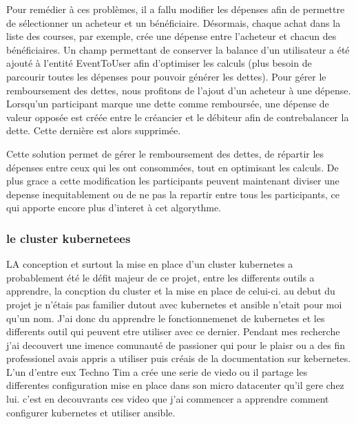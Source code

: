 Pour remédier à ces problèmes, il a fallu modifier les dépenses afin de permettre de sélectionner un acheteur et un bénéficiaire.
Désormais, chaque achat dans la liste des courses, par exemple, crée une dépense entre l'acheteur et chacun des bénéficiaires.
Un champ permettant de conserver la balance d'un utilisateur a été ajouté à l'entité EventToUser afin d'optimiser les calculs (plus besoin de parcourir toutes les dépenses pour pouvoir générer les dettes).
Pour gérer le remboursement des dettes, nous profitons de l'ajout d'un acheteur à une dépense.
Lorsqu'un participant marque une dette comme remboursée, une dépense de valeur opposée est créée entre le créancier et le débiteur afin de contrebalancer la dette.
Cette dernière est alors supprimée.

Cette solution permet de gérer le remboursement des dettes, de répartir les dépenses entre ceux qui les ont consommées, tout en optimisant les calculs.
De plus grace a cette modification les participants peuvent maintenant diviser une depense inequitablement ou de ne pas la repartir entre tous les participants,
ce qui apporte encore plus d'interet à cet algorythme.

\subsubsection{le cluster kubernetees}
LA conception et surtout la mise en place d'un cluster kubernetes a probablement été le défit majeur de ce projet, entre les differents outils a apprendre,
la concption du cluster et la mise en place de celui-ci.
au debut du projet je n'étais pas familier dutout avec kubernetes et ansible n'etait pour moi qu'un nom.
J'ai donc du apprendre le fonctionnemenet de kubernetes et les differents outil qui peuvent etre utiliser avec ce dernier.
Pendant mes recherche j'ai decouvert une imence comunauté de passioner qui pour le plaisr ou a des fin professionel avais appris a utiliser puis créais de la documentation sur kebernetes.
L'un d'entre eux Techno Tim a crée une serie de viedo ou il partage les differentes configuration mise en place dans son micro datacenter qu'il gere chez lui.
c'est en decouvrants ces video que j'ai commencer a apprendre comment configurer kubernetes et utiliser ansible.


